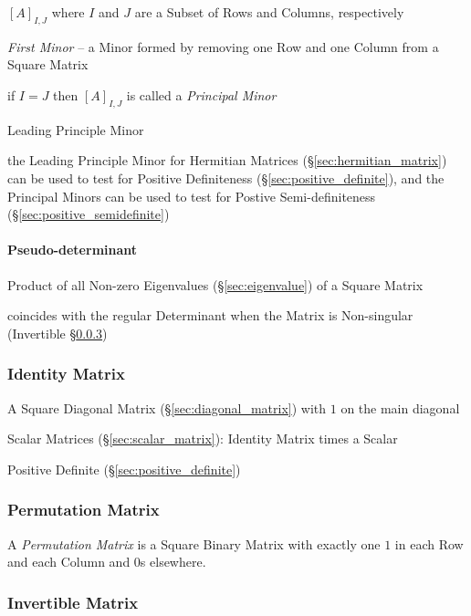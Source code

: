 $[A]_{I,J}$ where $I$ and $J$ are a Subset of Rows and Columns, respectively

\emph{First Minor} -- a Minor formed by removing one Row and one Column from a
Square Matrix

if $I = J$ then $[A]_{I,J}$ is called a \emph{Principal Minor}

Leading Principle Minor

the Leading Principle Minor for Hermitian Matrices
(\S\ref{sec:hermitian_matrix}) can be used to test for Positive Definiteness
(\S\ref{sec:positive_definite}), and the Principal Minors can be used to test
for Postive Semi-definiteness (\S\ref{sec:positive_semidefinite})



\paragraph{Pseudo-determinant}\label{sec:pseudo_determinant}\hfill

Product of all Non-zero Eigenvalues (\S\ref{sec:eigenvalue}) of a Square Matrix

coincides with the regular Determinant when the Matrix is Non-singular
(Invertible \S\ref{sec:invertible_matrix})



\subsubsection{Identity Matrix}\label{sec:identity_matrix}

A Square Diagonal Matrix (\S\ref{sec:diagonal_matrix}) with $1$ on the main
diagonal

Scalar Matrices (\S\ref{sec:scalar_matrix}): Identity Matrix times a Scalar

Positive Definite (\S\ref{sec:positive_definite})



\subsubsection{Permutation Matrix}\label{sec:permutation_matrix}

A \emph{Permutation Matrix} is a Square Binary Matrix with exactly one
$1$ in each Row and each Column and $0$s elsewhere.




\subsubsection{Invertible Matrix}\label{sec:invertible_matrix}

